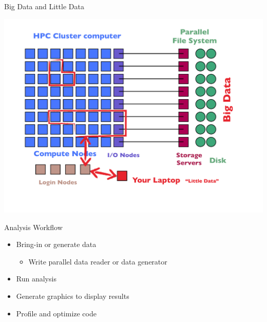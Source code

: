 \begin{frame}{Big Data and Little Data}
\begin{minipage}{11cm}
  \includegraphics[width=1.25\textheight]
  {../common/pics/hardware/ParallelHardware22.pdf}\hfill
\end{minipage}
\begin{minipage}{4cm}
  \begin{block}{Analysis Workflow}\pause
    \begin{itemize}[<+-|alert@+>]
    \item Bring-in or generate data
      \begin{itemize}
      \item Write parallel data reader or data generator
      \end{itemize}
    \item Run analysis
    \item Generate graphics to display results
    \item Profile and optimize code
    \end{itemize}
  \end{block}
\end{minipage}
\end{frame}

